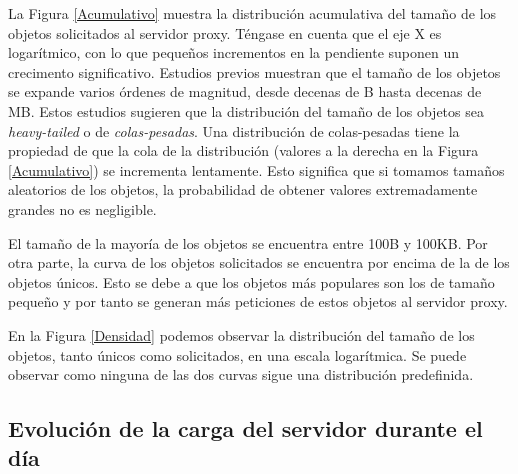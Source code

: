 \documentclass[twocolumn]{Jornadas}
\begin{document}
La Figura \ref{Acumulativo} muestra la distribución acumulativa del tamaño de los objetos solicitados al servidor proxy.
Téngase en cuenta que el eje X es logarítmico, con lo que pequeños incrementos en la pendiente suponen un crecimento significativo.
Estudios previos \cite{arlitt2, crovella} muestran que el tamaño de los objetos se expande varios órdenes de magnitud, desde decenas de B hasta decenas de MB.
Estos estudios sugieren que la distribución del tamaño de los objetos sea \emph{heavy-tailed} o de \emph{colas-pesadas}. Una distribución de colas-pesadas tiene la propiedad de que la cola de la distribución (valores a la derecha en la Figura \ref{Acumulativo}) se incrementa lentamente. Esto significa que si tomamos tamaños aleatorios de los objetos, la probabilidad de obtener valores extremadamente grandes no es negligible.


El tamaño de la mayoría de los objetos se encuentra entre 100B y 100KB.
Por otra parte, la curva de los objetos solicitados se encuentra por encima de la de los objetos únicos. Esto se debe a que los objetos más populares son los de tamaño pequeño y por tanto se generan más peticiones de estos objetos al servidor proxy.

En la Figura \ref{Densidad} podemos observar la distribución del tamaño de los objetos, tanto únicos como solicitados, en una escala logarítmica. Se puede observar como ninguna de las dos curvas sigue una distribución predefinida.

\subsection{Evolución de la carga del servidor durante el día}\label{cargaDia}
\end{document}
